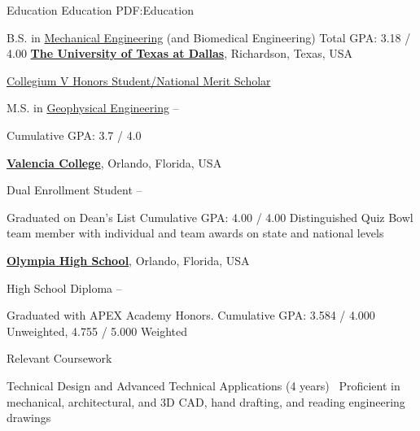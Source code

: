 \documentclass[letterpaper,MMMyyyy,nonstopmode]{simpleresumecv}
\begin{document}
\begin{Body}

\Section
{Education}
{Education}
{PDF:Education}


\Entry
B.S. in
\href{https://me.utdallas.edu}
{Mechanical Engineering}
(and Biomedical Engineering)
\hfill
Total GPA: 3.18 / 4.00
\BulletItem
\href{https://utdallas.edu}
{\textbf{The University of Texas at Dallas}},
Richardson, Texas, USA
\hfill
\begin{Detail}
\SubBulletItem
\href{https://honors.utdallas.edu/nmsp}
{Collegium V Honors Student/National Merit Scholar}

\end{Detail}

\iffalse
    	\Gap
    	\BulletItem
    	M.S. in
    	\href{http://www.example.com/my-department}
    	{Geophysical Engineering}
    	\hfill
    	 --
    	\begin{Detail}
    	\SubBulletItem
    	Cumulative GPA: 3.7 / 4.0
    	\end{Detail}
    \Entry
    \href{https://valenciacollege.edu/}
    {\textbf{Valencia College}},
    Orlando, Florida, USA
    
    \BulletItem
    Dual Enrollment Student
    \hfill
     --
    \begin{Detail}
    \SubBulletItem
    Graduated on Dean's List %
    \SubBulletItem
    Cumulative GPA: 4.00 / 4.00
    \SubBulletItem
    Distinguished Quiz Bowl team member with individual and team awards on state and national levels
    
    \end{Detail}
    \Entry
    \href{https://olympiahs.ocps.net}
    {\textbf{Olympia High School}},
    Orlando, Florida, USA
    
    \BulletItem
    High School Diploma
    \hfill
     --
    \begin{Detail}
    \SubBulletItem
    Graduated with APEX Academy Honors.
    \SubBulletItem
    Cumulative GPA: 3.584 / 4.000 Unweighted, 4.755 / 5.000 Weighted
    \end{Detail}
    \BulletItem
    Relevant Coursework
    \begin{Detail}
    \BulletItem
    Technical Design and Advanced Technical Applications (4 years)\
    \SubBulletItem
    Proficient in mechanical, architectural, and 3D CAD, hand drafting, and reading engineering drawings
    

\end{Detail}
\end{Body}
\end{document}
